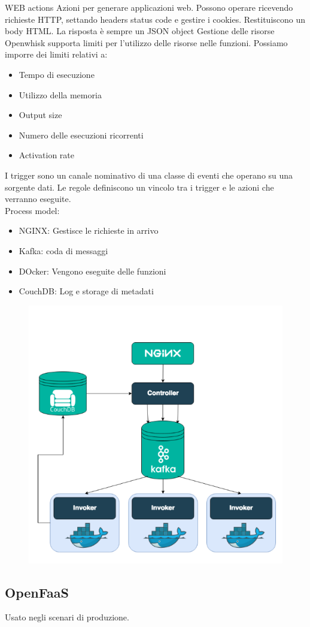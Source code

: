 \documentclass{article}
\begin{document}
		WEB actions
		Azioni per generare applicazioni web. Possono operare ricevendo richieste HTTP, settando headers status code e gestire i cookies. Restituiscono un body HTML. La risposta è sempre un JSON object
		Gestione delle risorse
		Openwhisk supporta limiti per l'utilizzo delle risorse nelle funzioni. Possiamo imporre dei limiti relativi a:
		\begin{itemize}
		    \item Tempo di esecuzione
		    \item Utilizzo della memoria
		    \item Output size
		    \item Numero delle esecuzioni ricorrenti
		    \item Activation rate
		\end{itemize}
		I trigger sono un canale nominativo di una classe di eventi che operano su una sorgente dati. Le regole definiscono un vincolo tra i trigger e le azioni che verranno eseguite.
		\\Process model:
		\begin{itemize}
		    \item NGINX: Gestisce le richieste in arrivo
		    \item Kafka: coda di messaggi
		    \item DOcker: Vengono eseguite delle funzioni
		    \item CouchDB: Log e storage di metadati
		\end{itemize}
		
		\begin{figure}[ht]
		\centering
		\includegraphics[width=0.5\linewidth]{SAC_B4_openwhisk}
		\label{fig:sacb4openwhisk}
		\end{figure}
		
		\subsection{OpenFaaS}
		Usato negli scenari di produzione.
		
\end{document}
